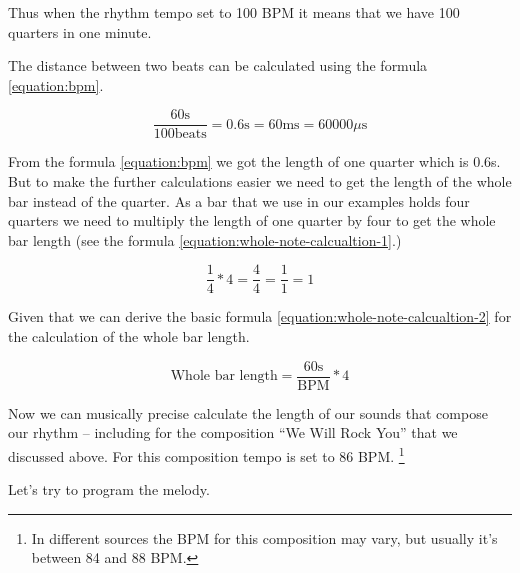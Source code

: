 \documentclass[../sparc.tex]{subfiles}
\begin{document}
Thus when the rhythm tempo set to 100 BPM it means that we have 100 quarters in
one minute.


The distance between two beats can be calculated using the formula
\ref{equation:bpm}.

\begin{equation}
  \frac{60 \mbox{s}}{100 \mbox{beats}} = 0.6 \mbox{s} = 60 \mbox{ms} = 60000 \mu\mbox{s}
  \label{equation:bpm}
\end{equation}

From the formula \ref{equation:bpm} we got the length of one quarter which is
0.6s.  But to make the further calculations easier we need to get the length of
the whole bar instead of the quarter.  As a bar that we use in our examples
holds four quarters we need to multiply the length of one quarter by four to get
the whole bar length (see the formula \ref{equation:whole-note-calcualtion-1}.)

\begin{equation}
  \frac{1}{4} * 4 = \frac{4}{4} = \frac{1}{1} = 1
  \label{equation:whole-note-calcualtion-1}
\end{equation}

Given that we can derive the basic formula
\ref{equation:whole-note-calcualtion-2} for the calculation of the whole bar
length.

\begin{equation}
  \mbox{Whole bar length} = \frac{60 \mbox{s}}{\mbox{BPM}} * 4
  \label{equation:whole-note-calcualtion-2}
\end{equation}

Now we can musically precise calculate the length of our sounds that compose our
rhythm -- including for the composition ``We Will Rock You'' that we discussed
above.  For this composition tempo is set to 86 BPM. \footnote{In different
sources the BPM for this composition may vary, but usually it's between 84 and
88 BPM.}

Let's try to program the melody.
\end{document}
